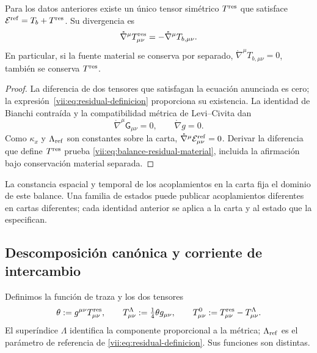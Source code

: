 \begin{theorem}
\label{vii:thm:residual-unicidad-balance}
Para los datos anteriores existe un único tensor simétrico
\(T^{\rm res}\) que satisface
\(\mathcal E^{\rm ref}=T_b+T^{\rm res}\). Su divergencia es
\begin{equation}
 \mathring\nabla^\mu T^{\rm res}_{\mu\nu}
 =-\mathring\nabla^\mu T_{b,\mu\nu}.
 \label{vii:eq:balance-residual-material}
\end{equation}
En particular, si la fuente material se conserva por separado,
\(\mathring\nabla^\mu T_{b,\mu\nu}=0\), también se conserva
\(T^{\rm res}\).
\end{theorem}
\begin{proof}
La diferencia de dos tensores que satisfagan la ecuación anunciada es
cero; la expresión~\eqref{vii:eq:residual-definicion} proporciona su
existencia. La identidad de Bianchi contraída y la compatibilidad métrica
de Levi--Civita dan
\[
 \mathring\nabla^\mu\mathsf G_{\mu\nu}=0,
 \qquad \mathring\nabla g=0.
\]
Como \(\kappa_x\) y \(\Lambda_{\rm ref}\) son constantes sobre la
carta, \(\mathring\nabla^\mu\mathcal E^{\rm ref}_{\mu\nu}=0\).
Derivar la diferencia que define \(T^{\rm res}\) prueba
\eqref{vii:eq:balance-residual-material}, incluida la afirmación bajo
conservación material separada.
\end{proof}

La constancia espacial y temporal de los acoplamientos en la carta fija
el dominio de este balance. Una familia de estados puede publicar
acoplamientos diferentes en cartas diferentes; cada identidad anterior
se aplica a la carta y al estado que la especifican.

\subsection{Descomposición canónica y corriente de intercambio}
\label{vii:subsec:traza-corriente-residual}

Definimos la función de traza y los dos tensores
\begin{equation}
 \theta:=g^{\mu\nu}T^{\rm res}_{\mu\nu},\qquad
 T^{\Lambda}_{\mu\nu}:=\tfrac14\theta g_{\mu\nu},\qquad
 T^{0}_{\mu\nu}:=T^{\rm res}_{\mu\nu}-T^{\Lambda}_{\mu\nu}.
 \label{vii:eq:descomposicion-traza-residual}
\end{equation}
El superíndice \(\Lambda\) identifica la componente proporcional a la
métrica; \(\Lambda_{\rm ref}\) es el parámetro de referencia de
\eqref{vii:eq:residual-definicion}. Sus funciones son distintas.

